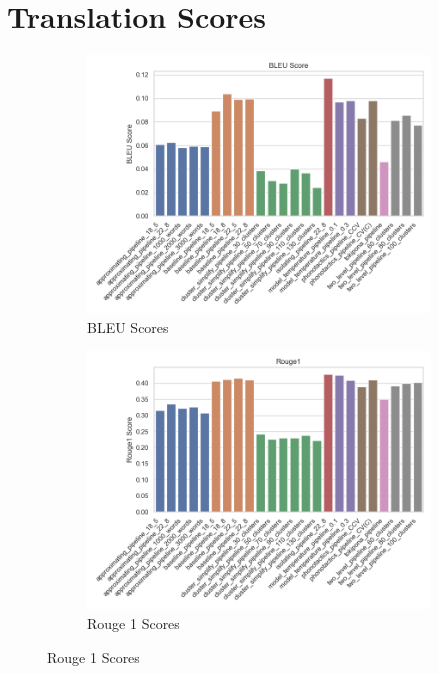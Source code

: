 \section{Translation Scores}

\begin{figure}[H]  
    \centering
    \begin{subfigure}[b]{0.48\linewidth}
        \includegraphics[width=0.7\linewidth]{figures/results/bleu_scores.png}
        \caption{BLEU Scores}
        \label{fig:bleu-scores}
    \end{subfigure}
    \hfill
    \begin{subfigure}[b]{0.48\linewidth}
        \includegraphics[width=0.7\linewidth]{figures/results/rouge1_scores.png}
        \caption{Rouge 1 Scores}
        \label{fig:rouge1-scores}
    \end{subfigure}


\end{figure}
